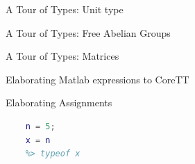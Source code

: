 \documentclass[handout]{beamer}
\newcommand{\tikzmark}[1]{\tikz[overlay,remember picture,baseline=-0.5ex] \node (#1) {};}
\begin{document}
\begin{frame}{A Tour of Types: Unit type}
\end{frame}

\begin{frame}{A Tour of Types: Free Abelian Groups}

\end{frame}


\begin{frame}{A Tour of Types: Matrices}

\end{frame}

\begin{frame}{Elaborating Matlab expressions to CoreTT}

\end{frame}


\begin{frame}[fragile]{Elaborating Assignments}
  \begin{lstlisting}[escapechar=@, language=Matlab, xleftmargin=10em, gobble=4]
    %> n@\tikzmark{ndecl}@ :: int
    n = 5;
    x = n
    %> typeof x
  \end{lstlisting}
\end{frame}
\end{document}
